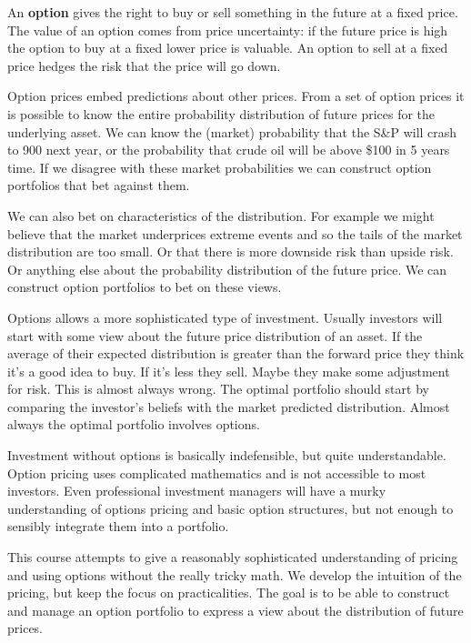 An \textbf{option} gives the right to buy or sell something in the future at a fixed price. The value of an option comes from price uncertainty: if the future price is high the option to buy at a fixed lower price is valuable. An option to sell at a fixed price hedges the risk that the price will go down.

Option prices embed predictions about other prices. From a set of option prices it is possible to know the entire probability distribution of future prices for the underlying asset. We can know the (market) probability that the S\&P will crash to 900 next year, or the probability that crude oil will be above \$100 in 5 years time. If we disagree with these market probabilities we can construct option portfolios that bet against them.

We can also bet on characteristics of the distribution. For example we might believe that the market underprices extreme events and so the tails of the market distribution are too small. Or that there is more downside risk than upside risk.  Or anything else about the probability distribution of the future price. We can construct option portfolios to bet on these views. 

Options allows a more sophisticated type of investment. Usually investors will start with some view about the future price distribution of an asset. If the average of their expected distribution is greater than the forward price they think it's a good idea to buy. If it's less they sell. Maybe they make some adjustment for risk. This is almost always wrong. The optimal portfolio should start by comparing the investor's beliefs with the market predicted distribution. Almost always the optimal portfolio involves options.

Investment without options is basically indefensible, but quite understandable. Option pricing uses complicated mathematics and is not accessible to most investors. Even professional investment managers will have a murky understanding of options pricing and basic option structures, but not enough to sensibly integrate them into a portfolio. 

This course attempts to give a reasonably sophisticated understanding of pricing and using options without the really tricky math. We develop the intuition of the pricing, but keep the focus on practicalities. The goal is to be able to construct and manage an option portfolio to express a view about the distribution of future prices. 

